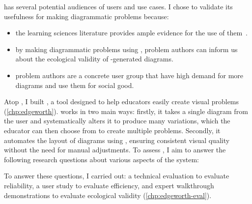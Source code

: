 \label{rq:expressiveness}

\Penrose has several potential audiences of users and use cases. I chose to validate its usefulness for making diagrammatic problems because:

\begin{itemize}
    \item the learning sciences literature provides ample evidence for the use of them~\cite{multipleReps, mayer_multimedia_2002, blum_combining_1998}.
    \item by making diagrammatic problems using \Penrose, problem authors can inform us about the ecological validity of \Penrose-generated diagrams.
    \item problem authors are a concrete user group that have high demand for more diagrams and use them for social good.
\end{itemize}

Atop \Penrose, I built \Edgeworth, a tool designed to help educators easily create visual problems (\cref{chp:edgeworth}). \Edgeworth works in two main ways: firstly, it takes a single diagram from the user and systematically alters it to produce many variations, which the educator can then choose from to create multiple problems. Secondly, it automates the layout of diagrams using \Penrose, ensuring consistent visual quality without the need for manual adjustments. To assess \Edgeworth, I aim to answer the following research questions about various aspects of the system:


To answer these questions, I carried out: a technical evaluation to evaluate reliability, a user study to evaluate efficiency, and expert walkthrough demonstrations to evaluate ecological validity (\cref{chp:edgeworth-eval}). 

